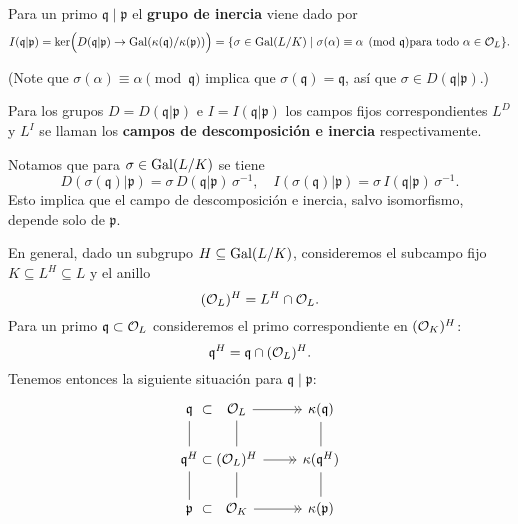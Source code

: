\begin{definicion}
  Para un primo $\mathfrak{q} \mid \mathfrak{p}$ el \textbf{grupo de inercia}
  viene dado por
  \[ I (\mathfrak{q}|\mathfrak{p})
  = \ker \Bigl(D (\mathfrak{q}|\mathfrak{p}) \to \operatorname{Gal} (\kappa(\mathfrak{q}) / \kappa(\mathfrak{p}))\Bigr)
  = \{ \sigma \in \operatorname{Gal} (L/K) \mid \sigma (\alpha) \equiv \alpha \pmod{\mathfrak{q}}
  \text{para todo }\alpha \in \mathcal{O}_L \}. \]
\end{definicion}

\noindent (Note que $\sigma (\alpha) \equiv \alpha \pmod{\mathfrak{q}}$ implica
que $\sigma (\mathfrak{q}) = \mathfrak{q}$, así que
$\sigma \in D (\mathfrak{q}|\mathfrak{p})$.)

\begin{definicion}
  Para los grupos $D = D (\mathfrak{q}|\mathfrak{p})$ e
  $I = I (\mathfrak{q}|\mathfrak{p})$ los campos fijos correspondientes
  $L^D$ y $L^I$ se llaman los \textbf{campos de descomposición e inercia}
  respectivamente.
\end{definicion}

Notamos que para $\sigma \in \operatorname{Gal} (L/K)$ se tiene
\[ D (\sigma (\mathfrak{q})|\mathfrak{p}) =
\sigma \, D (\mathfrak{q}|\mathfrak{p}) \, \sigma^{-1}, \quad
I (\sigma (\mathfrak{q})|\mathfrak{p}) =
\sigma \, I (\mathfrak{q}|\mathfrak{p}) \, \sigma^{-1}. \]
Esto implica que el campo de descomposición e inercia, salvo isomorfismo,
depende solo de $\mathfrak{p}$.

\vspace{1em}

En general, dado un subgrupo $H \subseteq \operatorname{Gal} (L/K)$, consideremos el subcampo
fijo $K \subseteq L^H \subseteq L$ y el anillo
$$(\mathcal{O}_L)^H = L^H \cap \mathcal{O}_L.$$
Para un primo $\mathfrak{q} \subset \mathcal{O}_L$ consideremos el primo correspondiente
en $(\mathcal{O}_K)^H$:
$$\mathfrak{q}^H = \mathfrak{q} \cap (\mathcal{O}_L)^H.$$
Tenemos entonces la siguiente situación para $\mathfrak{q} \mid \mathfrak{p}$:
\[ \begin{tikzcd}
  \mathfrak{q}\ar[-]{d} &[-3em] \subset &[-3em] \O_L\ar[-]{d}\ar[->>]{r} & \kappa (\mathfrak{q}) \ar[-]{d} \\
  \mathfrak{q}^H\ar[-]{d} & \subset & (\O_L)^H \ar[-]{d}\ar[->>]{r} & \kappa (\mathfrak{q}^H) \ar[-]{d} \\
  \mathfrak{p} & \subset & \O_K \ar[->>]{r} & \kappa (\mathfrak{p})
\end{tikzcd} \]

